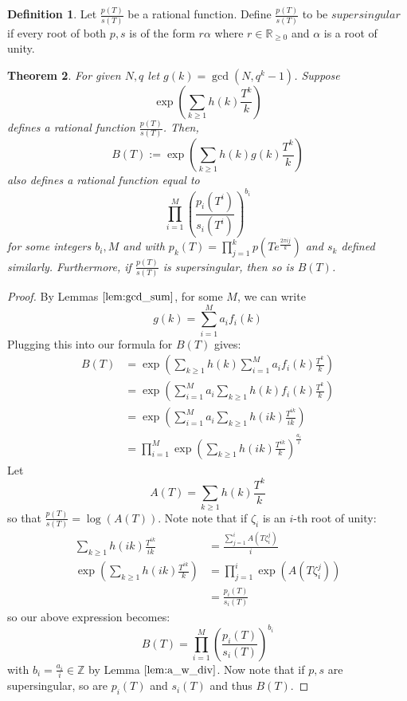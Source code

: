 \documentclass{article}
\newcommand{\R}{\mathbb{R}}
\newcommand{\Z}{\mathbb{Z}}
\newtheorem{theorem}{Theorem}[section]
\theoremstyle{definition}
\theoremstyle{definition}
\newtheorem{definition}[theorem]{Definition}
\theoremstyle{remark}
\begin{document}
\begin{definition}
Let $\frac{p(T)}{s(T)}$ be a rational function. Define $\frac{p(T)}{s(T)}$ to be $\textit{supersingular}$ if every root of both $p,s$ is of the form $r\alpha$ where $r \in \R_{\ge 0}$ and $\alpha$ is a root of unity. 
\end{definition}
\begin{theorem}
\label{gcd_power}
For given $N, q$ let $g(k) = \gcd(N, q^k - 1)$. Suppose 
\[\exp\left(\sum_{k \ge 1} h(k)\frac{T^k}{k}\right)\]
defines a rational function $\frac{p(T)}{s(T)}$. Then, 
\[B(T) := \exp\left(\sum_{k \ge 1} h(k)g(k)\frac{T^k}{k}\right)\]
also defines a rational function equal to
\[\prod_{i = 1}^M \left( \frac{p_i(T^i)}{s_i(T^i)}\right)^{b_i}\]
for some integers $b_i, M$ and with $p_k(T) = \prod_{j = 1}^k p(Te^{\frac{2\pi ij}{k}})$ and $s_k$ defined similarly. Furthermore, if $\frac{p(T)}{s(T)}$ is supersingular, then so is $B(T)$.
\end{theorem}

\begin{proof}
By Lemmas $\ref{lem:gcd_sum}$, for some $M$, we can write
\[g(k) = \sum_{i = 1}^M a_if_i(k)\]
Plugging this into our formula for $B(T)$ gives:
\begin{align*}
B(T) &= \exp\left(\sum_{k \ge 1} h(k)\sum_{i = 1}^M a_if_i(k)\frac{T^k}{k}\right) \\
&= \exp\left(\sum_{i = 1}^M a_i \sum_{k \ge 1} h(k)f_i(k)\frac{T^k}{k}\right) \\
&= \exp\left(\sum_{i = 1}^M a_i \sum_{k \ge 1} h(ik)\frac{T^{ik}}{ik}\right) \\
&= \prod_{i = 1}^M\exp\left(\sum_{k \ge 1} h(ik)\frac{T^{ik}}{k}\right)^{\frac{a_i}{i}}
\end{align*}
Let 
\[A(T) =\sum_{k \ge 1} h(k)\frac{T^k}{k}\]
so that $\frac{p(T)}{s(T)} = \log(A(T))$. Note note that if $\zeta_i$ is an $i$-th root of unity:
\begin{align*}
\sum_{k \ge 1} h(ik)\frac{T^{ik}}{ik} &= \frac{\sum_{j = 1}^i A(T\zeta_i^j)}{i} \\
\exp\left(\sum_{k \ge 1} h(ik)\frac{T^{ik}}{k}\right) &= \prod_{j = 1}^i \exp(A(T\zeta_i^j)) \\
&= \frac{p_i(T)}{s_i(T)}
\end{align*}
so our above expression becomes:
\[B(T) = \prod_{i = 1}^M \left( \frac{p_i(T)}{s_i(T)}\right)^{b_i}\]
with $b_i = \frac{a_i}{i} \in \Z$ by Lemma $\ref{lem:a_w_div}$. Now note that if $p, s$ are supersingular, so are $p_i(T)$ and $s_i(T)$ and thus $B(T)$. 
\end{proof}
\end{document}
